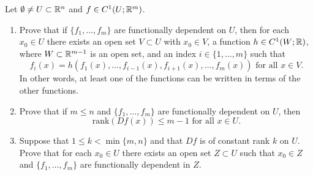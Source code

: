 \documentclass[a4paper]{article}
\begin{document}
\begin{thm}
  Let $\emptyset \neq U \subset \mathbb{R}^n$ and $f \in C^1(U;\mathbb{R}^m)$.

  \begin{enumerate}

    \item Prove that if $\{f_1,\dots,f_m\}$ are functionally dependent on
          $U$, then for each $x_0 \in U$ there exists an open set $V
          \subset U$ with $x_0 \in V$, a function $h \in C^1(W;\mathbb{R})$, where
          $W\subset \mathbb{R}^{m-1}$ is an open set, and an index $i
          \in\{1,\dots,m\}$ such that
          \[
            f_i(x) = h(f_1(x),\dots,f_{i-1}(x),f_{i+1}(x),
            \dots,f_m(x)) \text{ for all }x \in V.
          \]
          In other words, at least one of the functions can be written in
          terms of the other functions.

    \item Prove that if $m \le n$ and $\{f_1,\dots,f_m\}$ are functionally
          dependent on $U$, then
          \[
            \text{rank}(Df(x)) \le m-1 \text{ for all }x \in U.
          \]

    \item Suppose that $1 \le k < \min\{m,n\}$ and that $Df$ is of
          constant rank $k$ on $U$. Prove that for each $x_0\in U$ there
          exists an open set $Z \subset U$ such that $x_0 \in Z$ and
          $\{f_1,\dots,f_m\}$ are functionally dependent in $Z$.
  \end{enumerate}

\end{thm}
\end{document}
